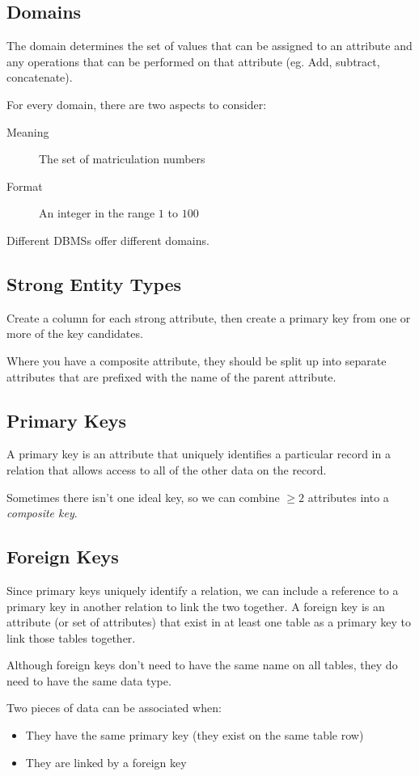 \subsection{Domains}\label{sub:domains}

The domain determines the set of values that can be assigned to an attribute  and any operations that can be performed on that attribute (eg. Add, subtract, concatenate).

For every domain, there are two aspects to consider:
\begin{description}
    \item[Meaning] The set of matriculation numbers
    \item[Format] An integer in the range \(1\) to \(100\)
\end{description}

\begin{note}
    Different DBMSs offer different domains.
\end{note}

\subsection{Strong Entity Types}\label{sub:strong_entity_types}

Create a column for each strong attribute, then create a primary key from one or more of the key candidates.

Where you have a composite attribute, they should be split up into separate attributes that are prefixed with the name of the parent attribute.

\subsection{Primary Keys}\label{sub:primary_keys}

A primary key is an attribute that uniquely identifies a particular record in a relation that allows access to all of the other data on the record.

Sometimes there isn't one ideal key, so we can combine \(\geq 2\) attributes into a \emph{composite key}.

\subsection{Foreign Keys}\label{sub:foreign_keys}

Since primary keys uniquely identify a relation, we can include a reference to a primary key in another relation to link the two together.
A foreign key is an attribute (or set of attributes) that exist in at least one table as a primary key to link those tables together.
\begin{note}
    Although foreign keys don't need to have the same name on all tables, they do need to have the same data type.
\end{note}
Two pieces of data can be associated when:
\begin{itemize}
    \item They have the same primary key (they exist on the same table row)
    \item They are linked by a foreign key
\end{itemize}

